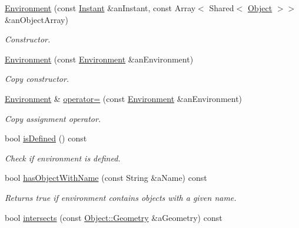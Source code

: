 \begin{DoxyCompactItemize}
\item 
\hyperlink{classlibrary_1_1physics_1_1_environment_a51854f130c31eb075ea623e332978495}{Environment} (const \hyperlink{classlibrary_1_1physics_1_1time_1_1_instant}{Instant} \&an\+Instant, const Array$<$ Shared$<$ \hyperlink{classlibrary_1_1physics_1_1env_1_1_object}{Object} $>$$>$ \&an\+Object\+Array)
\begin{DoxyCompactList}\small\item\em Constructor. \end{DoxyCompactList}\item 
\hyperlink{classlibrary_1_1physics_1_1_environment_afb2fe03dcd7061a8ed5e155d7d134ba2}{Environment} (const \hyperlink{classlibrary_1_1physics_1_1_environment}{Environment} \&an\+Environment)
\begin{DoxyCompactList}\small\item\em Copy constructor. \end{DoxyCompactList}\item 
\hyperlink{classlibrary_1_1physics_1_1_environment}{Environment} \& \hyperlink{classlibrary_1_1physics_1_1_environment_a3410b331642161ad087d76b7d5019a86}{operator=} (const \hyperlink{classlibrary_1_1physics_1_1_environment}{Environment} \&an\+Environment)
\begin{DoxyCompactList}\small\item\em Copy assignment operator. \end{DoxyCompactList}\item 
bool \hyperlink{classlibrary_1_1physics_1_1_environment_acbe2e199328ec6a3d2c233dbe8eb6359}{is\+Defined} () const
\begin{DoxyCompactList}\small\item\em Check if environment is defined. \end{DoxyCompactList}\item 
bool \hyperlink{classlibrary_1_1physics_1_1_environment_ab88060948d60e3775d3c48047e1565aa}{has\+Object\+With\+Name} (const String \&a\+Name) const
\begin{DoxyCompactList}\small\item\em Returns true if environment contains objects with a given name. \end{DoxyCompactList}\item 
bool \hyperlink{classlibrary_1_1physics_1_1_environment_a96b2455aff4cefe7d5ce92bb008a7d51}{intersects} (const \hyperlink{classlibrary_1_1physics_1_1env_1_1_object_abdf50733c7ad97327fb64edca5670f13}{Object\+::\+Geometry} \&a\+Geometry) const
$$
\end{DoxyCompactItemize}
